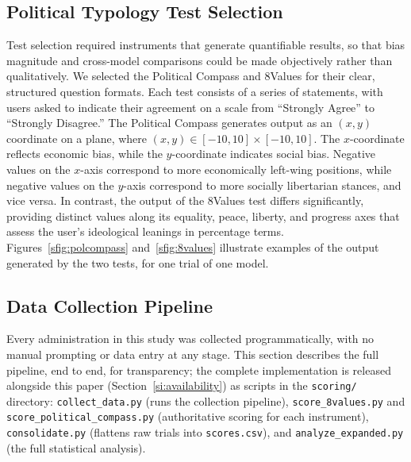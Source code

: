 \documentclass[11pt]{article}
\begin{document}
\subsection{Political Typology Test Selection}

Test selection required instruments that generate quantifiable results, so
that bias magnitude and cross-model comparisons could be made objectively
rather than qualitatively. We selected the Political Compass and 8Values
\citep{politicalcompass_nd, values8_2019} for their clear, structured question
formats. Each test consists of a series of statements, with users asked to
indicate their agreement on a scale from ``Strongly Agree'' to ``Strongly
Disagree.'' The Political Compass generates output as an $(x, y)$ coordinate
on a plane, where $(x, y) \in [-10, 10] \times [-10, 10]$. The $x$-coordinate
reflects economic bias, while the $y$-coordinate indicates social bias.
Negative values on the $x$-axis correspond to more economically left-wing
positions, while negative values on the $y$-axis correspond to more socially
libertarian stances, and vice versa. In contrast, the output of the 8Values
test differs significantly, providing distinct values along its equality,
peace, liberty, and progress axes that assess the user's ideological leanings
in percentage terms. Figures~\ref{sfig:polcompass} and~\ref{sfig:8values}
illustrate examples of the output generated by the two tests, for one trial
of one model.

\subsection{Data Collection Pipeline}
\label{si:data-collection}

Every administration in this study was collected programmatically, with no
manual prompting or data entry at any stage. This section describes the full
pipeline, end to end, for transparency; the complete implementation is
released alongside this paper (Section~\ref{si:availability}) as scripts in
the \texttt{scoring/} directory: \texttt{collect\_data.py} (runs the
collection pipeline), \texttt{score\_8values.py} and
\texttt{score\_political\_compass.py} (authoritative scoring for each
instrument), \texttt{consolidate.py} (flattens raw trials into
\texttt{scores.csv}), and \texttt{analyze\_expanded.py} (the full statistical
analysis).
\end{document}
